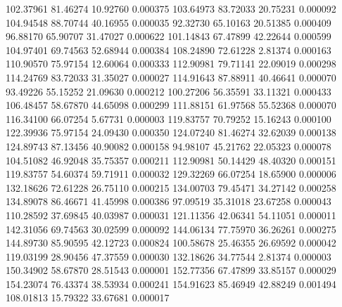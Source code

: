       102.37961       81.46274       10.92760       0.000375
      103.64973       83.72033       20.75231       0.000092
      104.94548       88.70744       40.16955       0.000035
       92.32730       65.10163       20.51385       0.000409
       96.88170       65.90707       31.47027       0.000622
      101.14843       67.47899       42.22644       0.000599
      104.97401       69.74563       52.68944       0.000384
      108.24890       72.61228        2.81374       0.000163
      110.90570       75.97154       12.60064       0.000333
      112.90981       79.71141       22.09019       0.000298
      114.24769       83.72033       31.35027       0.000027
      114.91643       87.88911       40.46641       0.000070
       93.49226       55.15252       21.09630       0.000212
      100.27206       56.35591       33.11321       0.000433
      106.48457       58.67870       44.65098       0.000299
      111.88151       61.97568       55.52368       0.000070
      116.34100       66.07254        5.67731       0.000003
      119.83757       70.79252       15.16243       0.000100
      122.39936       75.97154       24.09430       0.000350
      124.07240       81.46274       32.62039       0.000138
      124.89743       87.13456       40.90082       0.000158
       94.98107       45.21762       22.05323       0.000078
      104.51082       46.92048       35.75357       0.000211
      112.90981       50.14429       48.40320       0.000151
      119.83757       54.60374       59.71911       0.000032
      129.32269       66.07254       18.65900       0.000006
      132.18626       72.61228       26.75110       0.000215
      134.00703       79.45471       34.27142       0.000258
      134.89078       86.46671       41.45998       0.000386
       97.09519       35.31018       23.67258       0.000043
      110.28592       37.69845       40.03987       0.000031
      121.11356       42.06341       54.11051       0.000011
      142.31056       69.74563       30.02599       0.000092
      144.06134       77.75970       36.26261       0.000275
      144.89730       85.90595       42.12723       0.000824
      100.58678       25.46355       26.69592       0.000042
      119.03199       28.90456       47.37559       0.000030
      132.18626       34.77544        2.81374       0.000003
      150.34902       58.67870       28.51543       0.000001
      152.77356       67.47899       33.85157       0.000029
      154.23074       76.43374       38.53934       0.000241
      154.91623       85.46949       42.88249       0.001494
      108.01813       15.79322       33.67681       0.000017
